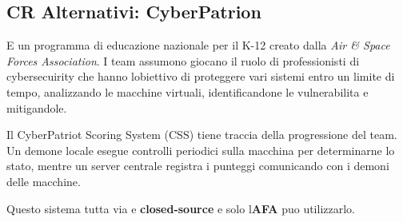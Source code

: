 \subsection{CR Alternativi:
CyberPatrion}\label{cr-alternativi-cyberpatrion}

E\textquotesingle{} un programma di educazione nazionale per il K-12
creato dalla \emph{Air \& Space Forces Association}. I team assumono
giocano il ruolo di professionisti di cybersecuirity che hanno
l\textquotesingle obiettivo di proteggere vari sistemi entro un limite
di tempo, analizzando le macchine virtuali, identificandone le
vulnerabilita e mitigandole.

Il CyberPatriot Scoring System (CSS) tiene traccia della progressione
del team. Un demone locale esegue controlli periodici sulla macchina per
determinarne lo stato, mentre un server centrale registra i punteggi
comunicando con i demoni delle macchine.

Questo sistema tutta via e\textquotesingle{} \textbf{closed-source} e
solo l\textquotesingle{}\textbf{AFA} puo\textquotesingle{} utilizzarlo.
